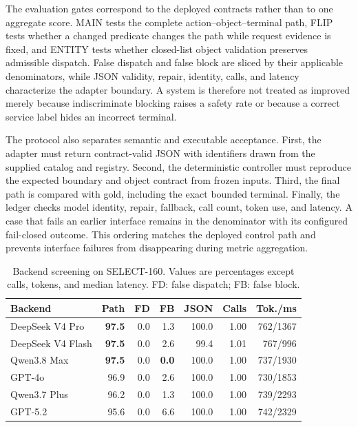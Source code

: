 \documentclass[10pt,conference,a4paper]{IEEEtran}
\begin{document}
The evaluation gates correspond to the deployed contracts rather than to one aggregate score. MAIN tests the complete action--object--terminal path, FLIP tests whether a changed predicate changes the path while request evidence is fixed, and ENTITY tests whether closed-list object validation preserves admissible dispatch. False dispatch and false block are sliced by their applicable denominators, while JSON validity, repair, identity, calls, and latency characterize the adapter boundary. A system is therefore not treated as improved merely because indiscriminate blocking raises a safety rate or because a correct service label hides an incorrect terminal.

The protocol also separates semantic and executable acceptance. First, the adapter must return contract-valid JSON with identifiers drawn from the supplied catalog and registry. Second, the deterministic controller must reproduce the expected boundary and object contract from frozen inputs. Third, the final path is compared with gold, including the exact bounded terminal. Finally, the ledger checks model identity, repair, fallback, call count, token use, and latency. A case that fails an earlier interface remains in the denominator with its configured fail-closed outcome. This ordering matches the deployed control path and prevents interface failures from disappearing during metric aggregation.

\begin{table}[!t]
\caption{Backend screening on SELECT-160. Values are percentages except calls, tokens, and median latency. FD: false dispatch; FB: false block.}
\label{tab:backend}
\centering
\scriptsize
\setlength{\tabcolsep}{2.0pt}
\renewcommand{\arraystretch}{1.12}
\begin{tabular}{@{}lrrrrrr@{}}
\toprule
Backend & Path & FD & FB & JSON & Calls & Tok./ms \\
\midrule
DeepSeek V4 Pro & \textbf{97.5} & 0.0 & 1.3 & 100.0 & 1.00 & 762/1367 \\
DeepSeek V4 Flash & \textbf{97.5} & 0.0 & 2.6 & 99.4 & 1.01 & 767/996 \\
Qwen3.8 Max & \textbf{97.5} & 0.0 & \textbf{0.0} & 100.0 & 1.00 & 737/1930 \\
GPT-4o & 96.9 & 0.0 & 2.6 & 100.0 & 1.00 & 730/1853 \\
Qwen3.7 Plus & 96.2 & 0.0 & 1.3 & 100.0 & 1.00 & 739/2293 \\
GPT-5.2 & 95.6 & 0.0 & 6.6 & 100.0 & 1.00 & 742/2329 \\
\bottomrule
\end{tabular}
\end{table}
\end{document}
